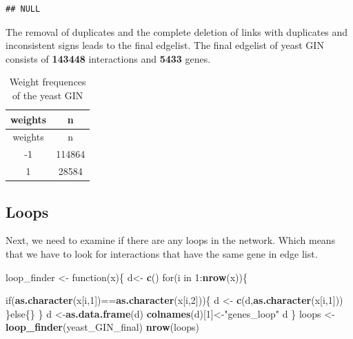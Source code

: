 \documentclass[12pt,]{article}
\newenvironment{Shaded}{\begin{snugshade}}{\end{snugshade}}
\newcommand{\KeywordTok}[1]{\textcolor[rgb]{0.13,0.29,0.53}{\textbf{{#1}}}}
\newcommand{\DataTypeTok}[1]{\textcolor[rgb]{0.13,0.29,0.53}{{#1}}}
\newcommand{\DecValTok}[1]{\textcolor[rgb]{0.00,0.00,0.81}{{#1}}}
\newcommand{\StringTok}[1]{\textcolor[rgb]{0.31,0.60,0.02}{{#1}}}
\newcommand{\NormalTok}[1]{{#1}}
\begin{document}
\begin{verbatim}
## NULL
\end{verbatim}

The removal of duplicates and the complete deletion of links with
duplicates and inconsistent signs leads to the final edgelist. The final
edgelist of yeast GIN consists of \textbf{143448} interactions and
\textbf{5433} genes.

\begin{Shaded}
\end{Shaded}

\begin{longtable}[]{@{}cc@{}}
\caption{Weight frequences of the yeast GIN}\tabularnewline
\toprule
weights & n\tabularnewline
\midrule
\endfirsthead
\toprule
weights & n\tabularnewline
\midrule
\endhead
-1 & 114864\tabularnewline
1 & 28584\tabularnewline
\bottomrule
\end{longtable}

\subsection{Loops}\label{loops}

Next, we need to examine if there are any loops in the network. Which
means that we have to look for interactions that have the same gene in
edge list.

\begin{Shaded}
\begin{Highlighting}[]
\NormalTok{loop_finder <-}\StringTok{ }\NormalTok{function(x)\{}
  \NormalTok{d<-}\StringTok{ }\KeywordTok{c}\NormalTok{()}
  \NormalTok{for(i in }\DecValTok{1}\NormalTok{:}\KeywordTok{nrow}\NormalTok{(x))\{}
   
    \NormalTok{if(}\KeywordTok{as.character}\NormalTok{(x[i,}\DecValTok{1}\NormalTok{])==}\KeywordTok{as.character}\NormalTok{(x[i,}\DecValTok{2}\NormalTok{]))\{}
      \NormalTok{d <-}\StringTok{ }\KeywordTok{c}\NormalTok{(d,}\KeywordTok{as.character}\NormalTok{(x[i,}\DecValTok{1}\NormalTok{]))}
    \NormalTok{\}else\{\}}
  \NormalTok{\}}
    \NormalTok{d <-}\KeywordTok{as.data.frame}\NormalTok{(d)}
    \KeywordTok{colnames}\NormalTok{(d)[}\DecValTok{1}\NormalTok{]<-}\StringTok{"genes_loop"}  
    \NormalTok{d}
  \NormalTok{\}}
\NormalTok{loops <-}\StringTok{ }\KeywordTok{loop_finder}\NormalTok{(yeast_GIN_final) }
\KeywordTok{nrow}\NormalTok{(loops)}
\end{Highlighting}
\end{Shaded}
\end{document}
